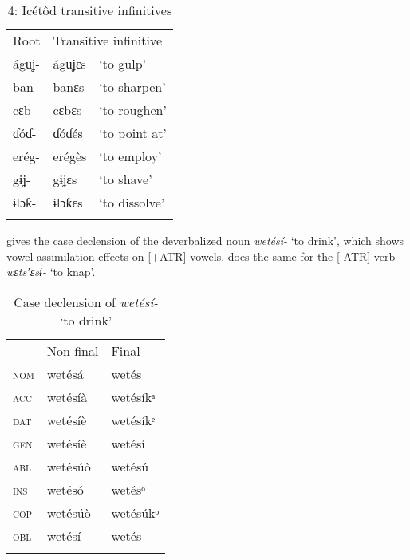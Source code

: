 \begin{table}
\caption{4: Icétôd transitive infinitives}
\label{tab:8}


\begin{tabularx}{\textwidth}{XXX}
\lsptoprule

Root & \multicolumn{2}{X}{Transitive infinitive}\\
ágʉʝ- & ágʉʝɛs & ‘to gulp’\\
ban- & banɛs & ‘to sharpen’\\
cɛb- & cɛbɛs & ‘to roughen’\\
ɗóɗ- & ɗóɗés & ‘to point at’\\
erég- & erégès & ‘to employ’\\
gɨʝ- & gɨʝɛs & ‘to shave’\\
ɨlɔƙ- & ɨlɔƙɛs & ‘to dissolve’\\
\lspbottomrule
\end{tabularx}
\end{table}

 gives the case declension of the deverbalized noun \textit{wetésí-} ‘to drink’, which shows vowel assimilation effects on [+ATR] vowels.  does the same for the [-ATR] verb \textit{wɛtsʼɛsɨ-} ‘to knap’.
 



\begin{table}
\caption{Case declension of \textit{wetésí-} ‘to drink’}
\label{tab:8.5}


\begin{tabularx}{\textwidth}{XXX}
& Non-final & Final\\
\lsptoprule
\textsc{nom} & wetésá & wetés\\
\textsc{acc} & wetésíà & wetésíkᵃ\\
\textsc{dat} & wetésíè & wetésíkᵉ\\
\textsc{gen} & wetésíè & wetésí\\
\textsc{abl} & wetésúò & wetésú\\
\textsc{ins} & wetésó & wetésᵒ\\
\textsc{cop} & wetésúò & wetésúkᵒ\\
\textsc{obl} & wetésí & wetés\\
\lspbottomrule
\end{tabularx}
\end{table}

